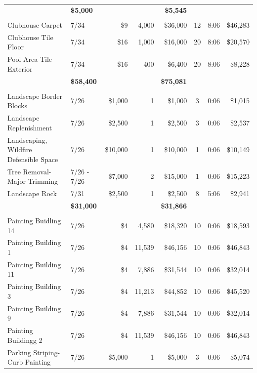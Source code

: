\documentclass[11pt,letterpaper]{article}
\begin{document}
\begin{longtable}{p{4.2cm} p{1.6cm} r r r c c r}
\addlinespace[1pt] \multicolumn{4}{r}{} & \textbf{\$5,000} & & & \textbf{\$5,545} \\
\addlinespace[6pt]
\multicolumn{8}{l}{\textbf{Flooring}} \\
Clubhouse Carpet & 7/34 & \$9 & 4,000 & \$36,000 & 12 & 8:06 & \$46,283 \\
\rowcolor{blue!12} Clubhouse Tile Floor & 7/34 & \$16 & 1,000 & \$16,000 & 20 & 8:06 & \$20,570 \\
Pool Area Tile Exterior & 7/34 & \$16 & 400 & \$6,400 & 20 & 8:06 & \$8,228 \\
\addlinespace[1pt] \multicolumn{4}{r}{} & \textbf{\$58,400} & & & \textbf{\$75,081} \\
\addlinespace[6pt]
\multicolumn{8}{l}{\textbf{Landscape}} \\
\rowcolor{blue!12} Landscape Border Blocks & 7/26 & \$1,000 & 1 & \$1,000 & 3 & 0:06 & \$1,015 \\
Landscape Replenishment & 7/26 & \$2,500 & 1 & \$2,500 & 3 & 0:06 & \$2,537 \\
\rowcolor{blue!12} Landscaping, Wildfire Defensible Space & 7/26 & \$10,000 & 1 & \$10,000 & 1 & 0:06 & \$10,149 \\
Tree Removal-Major Trimming & 7/26 - 7/26 & \$7,000 & 2 & \$15,000 & 1 & 0:06 & \$15,223 \\
\rowcolor{blue!12} Landscape Rock & 7/31 & \$2,500 & 1 & \$2,500 & 8 & 5:06 & \$2,941 \\
\addlinespace[1pt] \multicolumn{4}{r}{} & \textbf{\$31,000} & & & \textbf{\$31,866} \\
\addlinespace[6pt]
\multicolumn{8}{l}{\textbf{Painting}} \\
Painting Buidling 14 & 7/26 & \$4 & 4,580 & \$18,320 & 10 & 0:06 & \$18,593 \\
\rowcolor{blue!12} Painting Building 1 & 7/26 & \$4 & 11,539 & \$46,156 & 10 & 0:06 & \$46,843 \\
Painting Building 11 & 7/26 & \$4 & 7,886 & \$31,544 & 10 & 0:06 & \$32,014 \\
\rowcolor{blue!12} Painting Building 3 & 7/26 & \$4 & 11,213 & \$44,852 & 10 & 0:06 & \$45,520 \\
Painting Building 9 & 7/26 & \$4 & 7,886 & \$31,544 & 10 & 0:06 & \$32,014 \\
\rowcolor{blue!12} Painting Buildingg 2 & 7/26 & \$4 & 11,539 & \$46,156 & 10 & 0:06 & \$46,843 \\
Parking Striping-Curb Painting & 7/26 & \$5,000 & 1 & \$5,000 & 3 & 0:06 & \$5,074 \\

\end{longtable}
\end{document}
